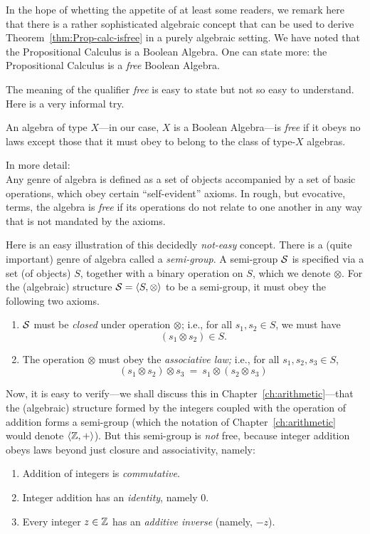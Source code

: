 In the hope of whetting the appetite of at least some readers, we
remark here that there is a rather sophisticated algebraic concept
that can be used to derive Theorem~\ref{thm:Prop-calc-isfree} in a
purely algebraic setting.  We have noted that the Propositional
Calculus is a Boolean Algebra.  One can state more: the Propositional
Calculus is a {\em free} Boolean Algebra.

\smallskip

The meaning of the qualifier {\it free} is easy to state but not so
easy to understand.  Here is a very informal try.

An algebra of type $X$---in our case, $X$ is a Boolean Algebra---is
{\em free} if it obeys no laws except those that it must obey to
belong to the class of type-$X$ algebras.

In more detail: \\
Any genre of algebra is defined as a set of objects accompanied by a
set of basic operations, which obey certain ``self-evident''
 axioms.  In rough, but
evocative, terms, the algebra is {\em free} if its operations do not
relate to one another in any way that is not mandated by the axioms.

Here is an easy illustration of this decidedly {\em not-easy} concept.
There is a (quite important) genre of algebra called a {\it
  semi-group}. A semi-group $\mbox{$\cal S$}$ is specified via a
set (of objects) $S$, together with a binary operation on $S$, which
we denote $\otimes$.  For the (algebraic) structure $\mbox{$\cal S$} = \langle S,
\otimes \rangle$ to be a semi-group, it must obey the following two
axioms.
\begin{enumerate}
\item
$\mbox{$\cal S$}$ must be {\it closed} under operation $\otimes$; i.e., for all
  $s_1, s_2 \in S$, we must have
\[ (s_1 \otimes s_2) \in S. \]
\item
The operation $\otimes$ must obey the {\em associative law;}
i.e., for all $s_1, s_2, s_3 \in S$,
\[ (s_1 \otimes s_2) \otimes s_3 \ = \ s_1 \otimes (s_2 \otimes s_3)
\]
\end{enumerate}

Now, it is easy to verify---we shall discuss this in
Chapter~\ref{ch:arithmetic}---that the (algebraic) structure formed by
the integers coupled with the operation of addition forms a semi-group
(which the notation of Chapter~\ref{ch:arithmetic} would denote
$\langle \mathbb{Z}, + \rangle$).  But this semi-group is {\em not}
free, because integer addition obeys laws beyond just closure and
associativity, namely:
\begin{enumerate}
\item
Addition of integers is {\em commutative}.
\item
Integer addition has an {\em identity}, namely $0$.
\item
Every integer $z \in \mathbb{Z}$ has an {\it additive inverse} (namely, $-z$).
\end{enumerate}

